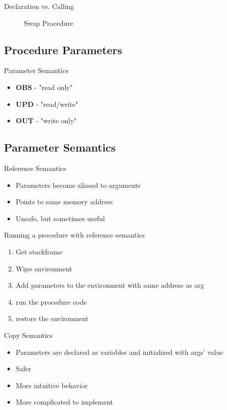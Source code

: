 \begin{frame}{Declaration vs. Calling}
    \begin{figure}
        
        \label{fig:ex1}
        \caption{Swap Procedure}
    \end{figure}
\end{frame}

\subsection{Procedure Parameters}
\begin{frame}{Parameter Semantics}
    \begin{itemize}
        \item \textbf{OBS} - "read only"
        \item \textbf{UPD} - "read/write"
        \item \textbf{OUT} - "write only"
    \end{itemize}
\end{frame}

\subsection{Parameter Semantics}
\begin{frame}{Reference Semantics}
    \begin{itemize}
        \item Parameters become aliased to arguments 
        \item Points to same memory address
        \item Unsafe, but sometimes useful
    \end{itemize}
\end{frame}
\begin{frame}{Running a procedure with reference semantics}
    \begin{enumerate}
        \item Get stackframe
        \item Wipe environment
        \item Add parameters to the environment with same address as arg
        \item run the procedure code
        \item restore the environment
    \end{enumerate}
\end{frame}
\begin{frame}{Copy Semantics}
    \begin{itemize}
        \item Parameters are declared as variables and initialized with args' value
        \item Safer
        \item More intuitive behavior
        \item More complicated to implement
    \end{itemize}
\end{frame}

